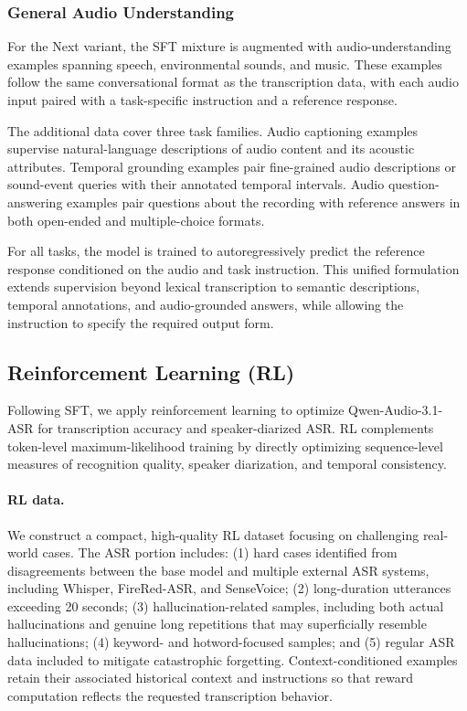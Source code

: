 \documentclass{article}
\begin{document}
\subsubsection{General Audio Understanding}
\label{subsubsec:audio-understanding-sft}
For the Next variant, the SFT mixture is augmented with audio-understanding examples spanning speech, environmental sounds, and music. These examples follow the same conversational format as the transcription data, with each audio input paired with a task-specific instruction and a reference response.

The additional data cover three task families. Audio captioning examples supervise natural-language descriptions of audio content and its acoustic attributes. Temporal grounding examples pair fine-grained audio descriptions or sound-event queries with their annotated temporal intervals. Audio question-answering examples pair questions about the recording with reference answers in both open-ended and multiple-choice formats.

For all tasks, the model is trained to autoregressively predict the reference response conditioned on the audio and task instruction. This unified formulation extends supervision beyond lexical transcription to semantic descriptions, temporal annotations, and audio-grounded answers, while allowing the instruction to specify the required output form.

%
%

%
%
%

%

%

%

%

%

\subsection{Reinforcement Learning (RL)}
\label{subsec:RL}

Following SFT, we apply reinforcement learning to optimize Qwen-Audio-3.1-ASR for transcription accuracy and speaker-diarized ASR. RL complements token-level maximum-likelihood training by directly optimizing sequence-level measures of recognition quality, speaker diarization, and temporal consistency.

\paragraph{RL data.}
We construct a compact, high-quality RL dataset focusing on challenging real-world cases. The ASR portion includes: (1) hard cases identified from disagreements between the base model and multiple external ASR systems, including Whisper, FireRed-ASR, and SenseVoice; (2) long-duration utterances exceeding 20 seconds; (3) hallucination-related samples, including both actual hallucinations and genuine long repetitions that may superficially resemble hallucinations; (4) keyword- and hotword-focused samples; and (5) regular ASR data included to mitigate catastrophic forgetting. Context-conditioned examples retain their associated historical context and instructions so that reward computation reflects the requested transcription behavior.
\end{document}
